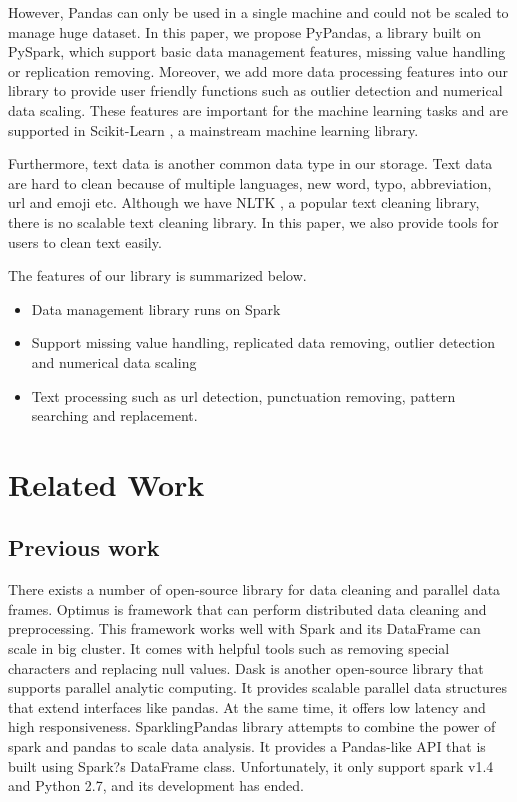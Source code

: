\documentclass[sigconf]{acmart}
\begin{document}
	However, Pandas can only be used in a single machine and could not be scaled to manage huge dataset. In this paper, we propose PyPandas, a library built on PySpark, which support basic data management features, missing value handling or replication removing. Moreover, we add more data processing features into our library to provide user friendly functions such as outlier detection and numerical data scaling. These features are important for the machine learning tasks and are supported in Scikit-Learn \cite{scikit-learn}, a mainstream machine learning library.
	
	Furthermore, text data is another common data type in our storage. Text data are hard to clean because of multiple languages, new word, typo, abbreviation, url and emoji etc. Although we have NLTK \cite{nltk}, a popular text cleaning library, there is no scalable text cleaning library. In this paper, we also provide tools for users to clean text easily. 
	
	The features of our library is summarized below.
	\begin{itemize}
		\item{Data management library runs on Spark}
		\item{Support missing value handling, replicated data removing, outlier detection and numerical data scaling}
		\item{Text processing such as url detection, punctuation removing, pattern searching and replacement. }
	\end{itemize}
	




\section{Related Work}
\subsection{Previous work}
There exists a number of open-source library for data cleaning and parallel data frames. Optimus \cite{optimus} is framework that can perform distributed data cleaning and preprocessing. This framework works well with Spark and its DataFrame can scale in big cluster. It comes with helpful tools such as removing special characters and replacing null values. Dask \cite{dask} is another open-source library that supports parallel analytic computing. It provides scalable parallel data structures that extend interfaces like pandas. At the same time, it offers low latency and high responsiveness. SparklingPandas\cite{sparklingpandas} library attempts to combine the power of spark and pandas to scale data analysis. It provides a Pandas-like API that is built using Spark?s DataFrame class. Unfortunately, it only support spark v1.4 and Python 2.7, and its development has ended.
\end{document}
